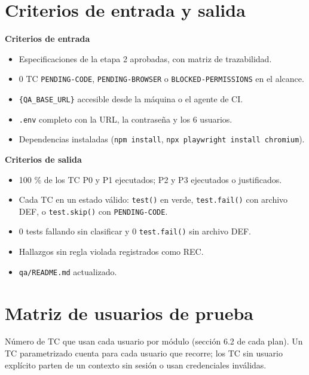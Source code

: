 \documentclass[10pt,a4paper]{article}
\begin{document}
\section{Criterios de entrada y salida}
\begin{minipage}[t]{0.485\textwidth}\raggedright
\textbf{Criterios de entrada}
\begin{itemize}
  \item Especificaciones de la etapa 2 aprobadas, con matriz de trazabilidad.
  \item 0 TC \texttt{PENDING-CODE}, \texttt{PENDING-BROWSER} o \texttt{BLOCKED-PERMISSIONS} en el alcance.
  \item \texttt{\{QA\_BASE\_URL\}} accesible desde la máquina o el agente de CI.
  \item \texttt{.env} completo con la URL, la contraseña y los 6 usuarios.
  \item Dependencias instaladas (\texttt{npm install}, \texttt{npx playwright install chromium}).
\end{itemize}
\end{minipage}\hfill
\begin{minipage}[t]{0.485\textwidth}\raggedright
\textbf{Criterios de salida}
\begin{itemize}
  \item 100 \% de los TC P0 y P1 ejecutados; P2 y P3 ejecutados o justificados.
  \item Cada TC en un estado válido: \texttt{test()} en verde, \texttt{test.fail()} con archivo DEF, o \texttt{test.skip()} con \texttt{PENDING-CODE}.
  \item 0 tests fallando sin clasificar y 0 \texttt{test.fail()} sin archivo DEF.
  \item Hallazgos sin regla violada registrados como REC.
  \item \texttt{qa/README.md} actualizado.
\end{itemize}
\end{minipage}

\section{Matriz de usuarios de prueba}
Número de TC que usan cada usuario por módulo (sección 6.2 de cada plan). Un TC parametrizado cuenta para cada usuario que recorre; los TC sin usuario explícito parten de un contexto sin sesión o usan credenciales inválidas.
\end{document}
